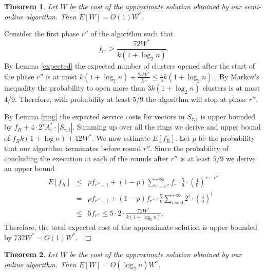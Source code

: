 \documentclass{article}
\newtheorem{theorem}{Theorem}
\newenvironment{proof}{\medskip\noindent {\bf Proof.}}{~\hfill$\Box$\medskip}
\begin{document}
\begin{theorem}
Let $W$ be the cost of the approximate solution obtained by our  semi-online algorithm. Then $E[W]=O\left(1\right) W^*$.
\end{theorem}
\begin{proof}
Consider the first  phase $r''$ of the algorithm such that 
$$f_{r''}\ge \frac{72W^*}{k(1+\log_2 n)}.$$
By Lemma \ref{expected} the expected number of clusters opened  after the start of the  phase $r''$ is at most $k(1+\log_2n) +\frac{24W^*}{f_{r''}}\le \frac43 k(1+\log_2n)$ . By Markov's inequality the probability to open more than $3 k(1+\log_2n) $ clusters is at most $4/9$. Therefore, with probability at least $5/9$ the algorithm will stop at phase $r''$.

 
By Lemma \ref{ring} the expected service costs for vectors in $S_{\tau,i}$ is upper bounded by $f_R+ 4\cdot 2^{\tau}A_i^*\cdot |S_{\tau,i}|$. Summing up over all the rings we derive and upper bound of
$f_Rk(1+\log n)+ 12W^*$.
%
We now estimate $E[f_R]$. Let $p$ be the probability that our algorithm terminates before round $r''$. 
Since the probability of concluding the execution at each of the rounds after $r''$ is at least $5/9$ we derive an upper bound
\begin{eqnarray*}
E[f_R]&\le& p f_{r''-1} + (1-p)\sum_{r=r''}^{+\infty}f_r\cdot \frac59 \cdot \left(\frac49\right)^{r-r''}\\
&=&p f_{r''-1} + (1-p)f_{r''}\cdot \frac59\sum_{i=0}^{+\infty}2^i\cdot \left(\frac49\right)^i\\
&\le& 5f_{r''}  \le 5 \cdot 2\cdot \frac{72W^*}{k(1+\log_2 n)}.
\end{eqnarray*}
 Therefore, the total expected cost of the approximate solution is upper bounded by $ 732W^*=O(1)W^*$.
\end{proof}
\begin{theorem}
Let $W$ be the cost of the approximate solution obtained by our  online algorithm. Then $E[W]=O\left(\log_2 n\right) W^*$.
\end{theorem}
\end{document}
